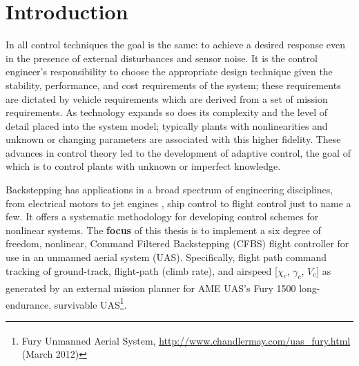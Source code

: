 \documentclass[12pt]{ucthesis}
\begin{document}
\chapter{Introduction}
\label{chp: intro}
%
%
In all control techniques the goal is the same: to achieve a desired response even in the presence of external disturbances and sensor noise. It is the control engineer's responsibility to choose the appropriate design technique given the stability, performance, and cost requirements of the system; these requirements are dictated by vehicle requirements which are derived from a set of mission requirements. As technology expands so does its complexity and the level of detail placed into the system model; typically plants with nonlinearities and unknown or changing parameters are associated with this higher fidelity. These advances in control theory led to the development of adaptive control, the goal of which is to control plants with unknown or imperfect knowledge.

Backstepping has applications in a broad spectrum of engineering disciplines, from electrical motors \citep{Rahman2003} to jet engines \citep{Krstic1998}, ship control \citep{Godhavn1998} to flight control \citep{Farrell2009} just to name a few. It offers a systematic methodology for developing control schemes for nonlinear systems. The \textbf{focus} of this thesis is to implement a six degree of freedom, nonlinear, Command Filtered Backstepping (CFBS) flight controller for use in an unmanned aerial system (UAS). Specifically, flight path command tracking of ground-track, flight-path (climb rate), and airspeed [$\chi_c$, $\gamma_c$, $V_c$] as generated by an external mission planner for AME UAS's Fury\textsuperscript{\textregistered} 1500 long-endurance, survivable UAS\footnote{Fury\textsuperscript{\textregistered} Unmanned Aerial System, \url{http://www.chandlermay.com/uas_fury.html} (March 2012)}.
%
\end{document}
